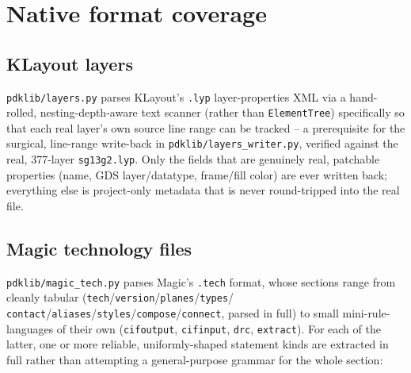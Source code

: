 \documentclass[a4paper,11pt]{article}
\begin{document}
\section{Native format coverage}

\subsection{KLayout layers}

\texttt{pdklib/layers.py} parses KLayout's \texttt{.lyp} layer-properties
XML via a hand-rolled, nesting-depth-aware text scanner (rather than
\texttt{ElementTree}) specifically so that each real layer's own
source line range can be tracked -- a prerequisite for the surgical,
line-range write-back in \texttt{pdklib/layers\_writer.py}, verified
against the real, 377-layer \texttt{sg13g2.lyp}. Only the fields that
are genuinely real, patchable properties (name, GDS layer/datatype,
frame/fill color) are ever written back; everything else is
project-only metadata that is never round-tripped into the real file.

\subsection{Magic technology files}
\label{sec:magic}

\texttt{pdklib/magic\_tech.py} parses Magic's \texttt{.tech} format,
whose sections range from cleanly tabular
(\texttt{tech}/\texttt{version}/\texttt{planes}/\texttt{types}/\allowbreak
\texttt{contact}/\texttt{aliases}/\texttt{styles}/\texttt{compose}/\texttt{connect},
parsed in full) to small mini-rule-languages of their own
(\texttt{cifoutput}, \texttt{cifinput}, \texttt{drc}, \texttt{extract}).
For each of the latter, one or more reliable, uniformly-shaped
statement kinds are extracted in full rather than attempting a
general-purpose grammar for the whole section:
\end{document}
